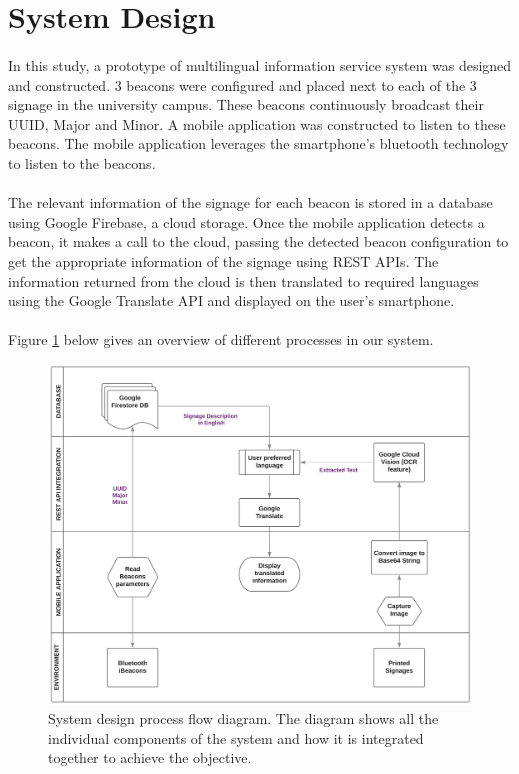 \documentclass[12pt]{article}
\begin{document}

\section{System Design}
\label{system}
\paragraph{}In this study, a prototype of multilingual information service system was designed and constructed. 3 beacons were configured and placed next to each of the 3 signage in the university campus. These beacons continuously broadcast their UUID, Major and Minor. A mobile application was constructed to listen to these beacons. The mobile application leverages the smartphone’s bluetooth technology to listen to the beacons.

\paragraph{}The relevant information of the signage for each beacon is stored in a database using Google Firebase, a cloud storage. Once the mobile application detects a beacon, it makes a call to the cloud, passing the detected beacon configuration to get the appropriate information of the signage using REST APIs. The information returned from the cloud is then translated to required languages using the Google Translate API and displayed on the user’s smartphone.

\paragraph{}Figure \ref{fig:system} below gives an overview of different processes in our system.

\begin{figure}[H]
	\centering
	\includegraphics[width=1\linewidth]{media/Architecture-3.png}
	\caption{System design process flow diagram. The diagram shows all the individual components of the system and how it is integrated together to achieve the objective.}
	\label{fig:system}
\end{figure} 
\end{document}
